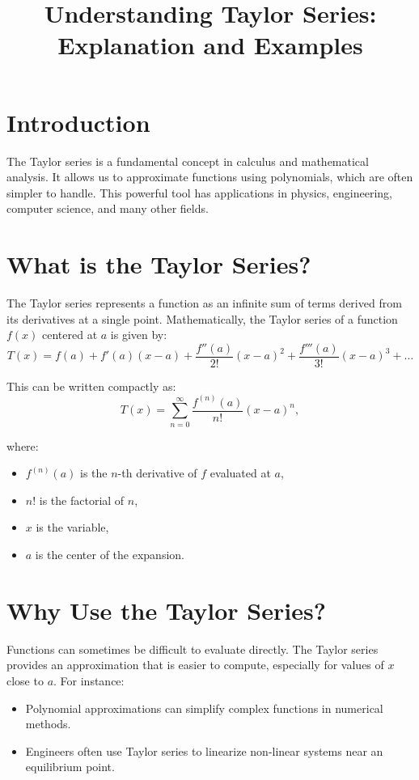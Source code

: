 \documentclass[12pt]{article}
\title{Understanding Taylor Series: Explanation and Examples}
\author{}
\date{}
\begin{document}
\maketitle

\section*{Introduction}
The Taylor series is a fundamental concept in calculus and mathematical analysis. It allows us to approximate functions using polynomials, which are often simpler to handle. This powerful tool has applications in physics, engineering, computer science, and many other fields.

\section*{What is the Taylor Series?}
The Taylor series represents a function as an infinite sum of terms derived from its derivatives at a single point. Mathematically, the Taylor series of a function $f(x)$ centered at $a$ is given by:
\[
T(x) = f(a) + f'(a)(x-a) + \frac{f''(a)}{2!}(x-a)^2 + \frac{f'''(a)}{3!}(x-a)^3 + \dots
\]

This can be written compactly as:
\[
T(x) = \sum_{n=0}^{\infty} \frac{f^{(n)}(a)}{n!}(x-a)^n,
\]

where:
\begin{itemize}
    \item $f^{(n)}(a)$ is the $n$-th derivative of $f$ evaluated at $a$,
    \item $n!$ is the factorial of $n$,
    \item $x$ is the variable,
    \item $a$ is the center of the expansion.
\end{itemize}

\section*{Why Use the Taylor Series?}
Functions can sometimes be difficult to evaluate directly. The Taylor series provides an approximation that is easier to compute, especially for values of $x$ close to $a$. For instance:
\begin{itemize}
    \item Polynomial approximations can simplify complex functions in numerical methods.
    \item Engineers often use Taylor series to linearize non-linear systems near an equilibrium point.
\end{itemize}
\end{document}
